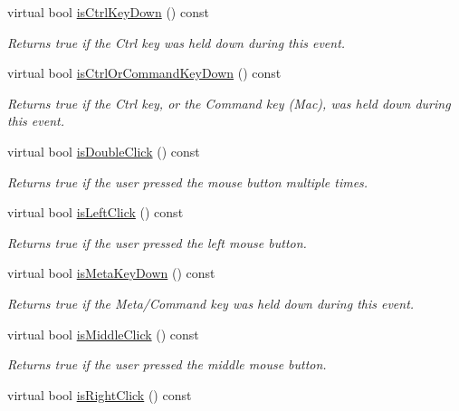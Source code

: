 \begin{DoxyCompactItemize}
virtual bool \mbox{\hyperlink{classsgl_1_1GEvent_a32ebd8661e615f5fbe15322b3423e06c}{is\+Ctrl\+Key\+Down}} () const
\begin{DoxyCompactList}\small\item\em Returns {\ttfamily true} if the Ctrl key was held down during this event. \end{DoxyCompactList}\item 
virtual bool \mbox{\hyperlink{classsgl_1_1GEvent_a96b51557188c36392073bf1a5f92d610}{is\+Ctrl\+Or\+Command\+Key\+Down}} () const
\begin{DoxyCompactList}\small\item\em Returns {\ttfamily true} if the Ctrl key, or the Command key (Mac), was held down during this event. \end{DoxyCompactList}\item 
virtual bool \mbox{\hyperlink{classsgl_1_1GEvent_a40b4e808443ad49df2a79a6b1011be7a}{is\+Double\+Click}} () const
\begin{DoxyCompactList}\small\item\em Returns true if the user pressed the mouse button multiple times. \end{DoxyCompactList}\item 
virtual bool \mbox{\hyperlink{classsgl_1_1GEvent_ae6b870593fd0c645b97f2382ac40253a}{is\+Left\+Click}} () const
\begin{DoxyCompactList}\small\item\em Returns true if the user pressed the left mouse button. \end{DoxyCompactList}\item 
virtual bool \mbox{\hyperlink{classsgl_1_1GEvent_a37aa61a279efea6cb36cb5e6d8ada04c}{is\+Meta\+Key\+Down}} () const
\begin{DoxyCompactList}\small\item\em Returns {\ttfamily true} if the Meta/\+Command key was held down during this event. \end{DoxyCompactList}\item 
virtual bool \mbox{\hyperlink{classsgl_1_1GEvent_a92daecef1639c08c9565df591d261026}{is\+Middle\+Click}} () const
\begin{DoxyCompactList}\small\item\em Returns true if the user pressed the middle mouse button. \end{DoxyCompactList}\item 
virtual bool \mbox{\hyperlink{classsgl_1_1GEvent_abf4c07eef83e15984a352af91c927d3d}{is\+Right\+Click}} () const

\end{DoxyCompactItemize}
